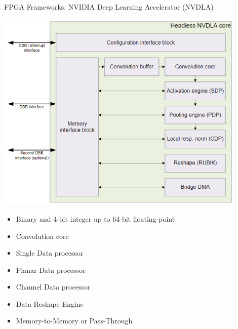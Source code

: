 \begin{frame}{FPGA Frameworks: NVIDIA Deep Learning Accelerator (NVDLA)}
	\begin{minipage}{0.5\textwidth}
		\centering
		\includegraphics[width=0.9\textwidth]{../Images/Hardware/nvdla-hardware-architecture.png}\\
	\end{minipage}%
	\begin{minipage}{0.5\textwidth}
		\begin{itemize}
			\item Binary and 4-bit integer up to 64-bit floating-point
			\item Convolution core
			\item Single Data processor
			\item Planar Data processor
			\item Channel Data processor
			\item Data Reshape Engine
			\item Memory-to-Memory or Pass-Through
		\end{itemize}
	\end{minipage}
\end{frame}
